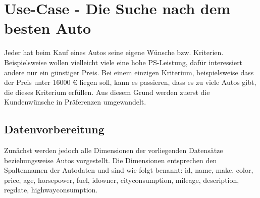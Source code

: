 \chapter{Use-Case - Die Suche nach dem besten Auto}
\label{ch:useCase}
Jeder hat beim Kauf eines Autos seine eigene Wünsche bzw. Kriterien. Beispielsweise wollen vielleicht viele eine hohe PS-Leistung, dafür interessiert andere nur ein günstiger Preis. Bei einem einzigen Kriterium, beispielsweise dass der Preis unter 16000 \euro{} liegen soll, kann es passieren, dass es zu viele Autos gibt, die dieses Kriterium erfüllen. Aus diesem Grund werden zuerst die Kundenwünsche in Präferenzen umgewandelt.
\section{Datenvorbereitung}
\label{ch:Evaluierung:sec:vorbereitung}
Zunächst werden jedoch alle Dimensionen der vorliegenden Datensätze beziehungsweise Autos vorgestellt. Die Dimensionen entsprechen den Spaltennamen der Autodaten und sind wie folgt benannt: id, name, make, color, price, age, horsepower, fuel, idowner, city\textunderscore consumption, mileage, description, reg\textunderscore date, highway\textunderscore consumption.

